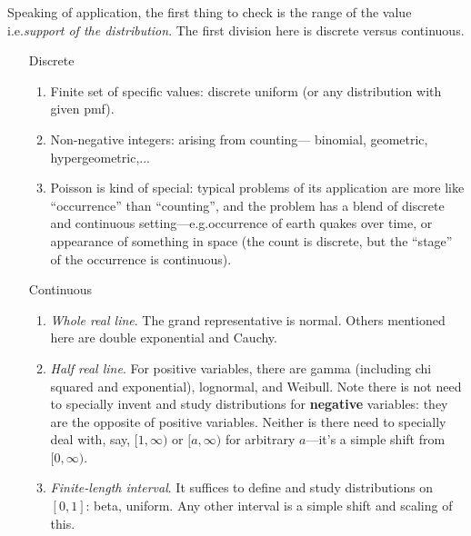 \documentclass[12pt]{article}
\begin{document}
Speaking of application,
the first thing to check is the range of the value
i.e.\@ \emph{support of the distribution}.
The first division here is discrete versus continuous.
\begin{enumerate}
\item[Discrete]
    \begin{enumerate}
    \item Finite set of specific values: discrete uniform
        (or any distribution with given pmf).
    \item Non-negative integers: arising from counting---%
        binomial, geometric, hypergeometric,...
    \item Poisson is kind of special: typical problems
        of its application are more like ``occurrence'' than
        ``counting'', and the problem has a blend of discrete and
        continuous setting---e.g.\@ occurrence of earth quakes
        over time, or appearance of something in space (the count is
        discrete, but the ``stage'' of the occurrence is continuous).
    \end{enumerate}
\item[Continuous]
    \begin{enumerate}
    \item \emph{Whole real line}.
        The grand representative is normal.
        Others mentioned here are double exponential and Cauchy.
    \item \emph{Half real line}.
        For positive variables, there are
        gamma (including chi squared and exponential),
        lognormal, and Weibull.
        Note there is not need to specially invent and study
        distributions for \textbf{negative} variables:
        they are the opposite of positive variables.
        Neither is there need to specially deal with, say,
        $[1, \infty)$ or $[a, \infty)$ for arbitrary $a$---it's a simple
        shift from $[0, \infty)$.
    \item \emph{Finite-length interval}.
        It suffices to define and study distributions on
        $[0, 1]$: beta, uniform.
        Any other interval is a simple shift and scaling of this.
    \end{enumerate}
\end{enumerate}
\end{document}
